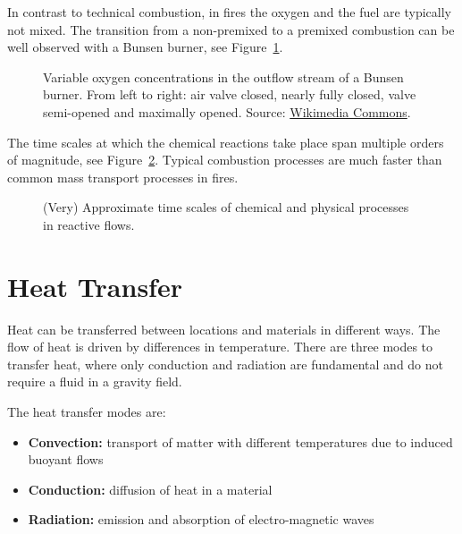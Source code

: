 \documentclass[
  letterpaper,
  DIV=11,
  numbers=noendperiod]{scrreprt}
\providecommand{\tightlist}{%
  \setlength{\itemsep}{0pt}\setlength{\parskip}{0pt}}\usepackage{longtable,booktabs,array}
\begin{document}
In contrast to technical combustion, in fires the oxygen and the fuel
are typically not mixed. The transition from a non-premixed to a
premixed combustion can be well observed with a Bunsen burner, see
Figure~\ref{fig-bunsen-burner}.

\begin{figure}


\caption{\label{fig-bunsen-burner}Variable oxygen concentrations in the
outflow stream of a Bunsen burner. From left to right: air valve closed,
nearly fully closed, valve semi-opened and maximally opened. Source:
\href{https://commons.wikimedia.org/wiki/File:Bunsen_burner_flame_types.jpg}{Wikimedia
Commons}.}

\end{figure}%

The time scales at which the chemical reactions take place span multiple
orders of magnitude, see Figure~\ref{fig-chem-time-scales}. Typical
combustion processes are much faster than common mass transport
processes in fires.

\begin{figure}


\caption{\label{fig-chem-time-scales}(Very) Approximate time scales of
chemical and physical processes in reactive flows.}

\end{figure}%

\section{Heat Transfer}\label{heat-transfer}

Heat can be transferred between locations and materials in different
ways. The flow of heat is driven by differences in temperature. There
are three modes to transfer heat, where only conduction and radiation
are fundamental and do not require a fluid in a gravity field.

The heat transfer modes are:

\begin{itemize}
\tightlist
\item
  \textbf{Convection:} transport of matter with different temperatures
  due to induced buoyant flows
\item
  \textbf{Conduction:} diffusion of heat in a material
\item
  \textbf{Radiation:} emission and absorption of electro-magnetic waves
\end{itemize}
\end{document}
